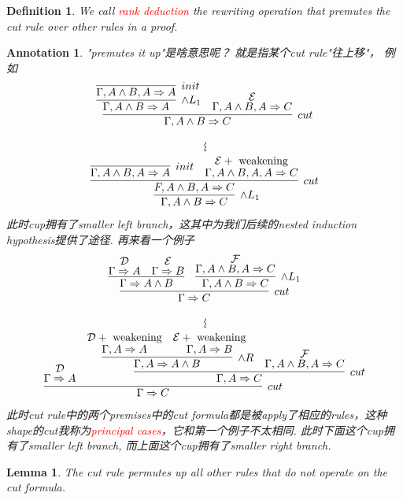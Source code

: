 \documentclass{article}
\theoremstyle{plain}
\newtheorem{lemma}[theorem]{Lemma}
\newtheorem{definition}[theorem]{Definition}
\newtheorem{annotation}[theorem]{Annotation}
\theoremstyle{nonumberplain}
\newcommand{\redt}[1]{\textcolor{red}{#1}}
\begin{document}
\begin{definition}
\rm We call \redt{rank deduction} the rewriting operation that premutes the cut rule over other rules in a proof. 
\end{definition}

\begin{annotation}
\rm "premutes it up"是啥意思呢？ 就是指某个cut rule"往上移"， 例如
$$
\begin{gathered}
\infer[cut]{\Gamma, A \wedge B \Rightarrow C}{\infer[\wedge L_1]{\Gamma, A \wedge B \Rightarrow A}{\infer[init]{\Gamma, A \wedge B,A \Rightarrow A}{}}  & \deduce{\Gamma, A \wedge B,A \Rightarrow C}{\mathcal{E}}}\\
\mathrel{\rotatebox{270}{$\leadsto$}}\\
\infer[\wedge L_1]{\Gamma, A \wedge B \Rightarrow C}{\infer[cut]{F, A \wedge B, A \Rightarrow C}{\infer[init]{\Gamma, A \wedge B, A \Rightarrow A}{} & \deduce{\Gamma, A \wedge B, A, A \Rightarrow C}{\mathcal{E} + ~\text{weakening}}}}
\end{gathered}
$$
此时cup拥有了smaller left branch，这其中为我们后续的nested induction hypothesis提供了途径. 再来看一个例子
$$
\begin{gathered}
\infer[cut]{\Gamma \Rightarrow C}{\infer{\Gamma \Rightarrow A \wedge B}{\deduce{\Gamma \Rightarrow A}{\mathcal{D}} & \deduce{\Gamma \Rightarrow B}{\mathcal{E}}} & \infer[\wedge L_1]{\Gamma, A \wedge B \Rightarrow C}{\deduce{\Gamma, A \wedge B, A \Rightarrow C}{\mathcal{F}}}} \\
\rotatebox{270}{$\leadsto$}\\
\infer[cut]{\Gamma \Rightarrow C}{\deduce{\Gamma \Rightarrow A}{\mathcal{D}} & \infer[cut]{\Gamma, A \Rightarrow C}{ \infer[\wedge R]{\Gamma, A \Rightarrow A \wedge B}{\deduce{\Gamma, A \Rightarrow A}{\mathcal{D}+~\text{weakening}} & \deduce{\Gamma,A \Rightarrow B}{\mathcal{E}+~\text{weakening}}}& \deduce{\Gamma, A \wedge B, A \Rightarrow C}{\mathcal{F}}}}
\end{gathered}
$$
此时\emph{cut rule}中的两个premises中的cut formula都是被apply了相应的rules，这种shape的cut我称为\redt{principal cases}，它和第一个例子不太相同. 此时下面这个cup拥有了smaller left branch, 而上面这个cup拥有了smaller right branch. 
\end{annotation}

\begin{lemma}\label{permute-is-safe}
\rm The \emph{cut} rule permutes up all other rules that do not operate on the cut formula.
\end{lemma}
\end{document}

